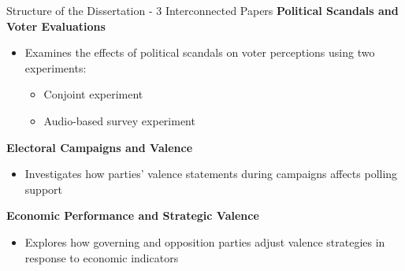 \documentclass[9pt, aspectratio=169]{beamer}
\newcommand{\customcites}[1]{\textcolor{blue}{\footnotesize\parencites{#1}}}
\begin{document}


\begin{frame}{Structure of the Dissertation - 3 Interconnected Papers}
    \textbf{Political Scandals and Voter Evaluations}  \vspace{0.2cm}
    \begin{itemize}
        \item Examines the effects of political scandals on voter perceptions using two experiments: \vspace{0.1cm}
        \begin{itemize}
            \item Conjoint experiment\vspace{0.1cm}
            \item Audio-based survey experiment
        \end{itemize}
    \end{itemize}
\vspace{0.3cm}
    \textbf{Electoral Campaigns and Valence}  \vspace{0.2cm}
    \begin{itemize}
        \item Investigates how parties’ valence statements during campaigns affects polling support
    \end{itemize}
    \vspace{0.3cm}
    
    \textbf{Economic Performance and Strategic Valence}  \vspace{0.2cm}
    \begin{itemize}
        \item Explores how governing and opposition parties adjust valence strategies in response to economic indicators
    \end{itemize}
\end{frame}
\end{document}
